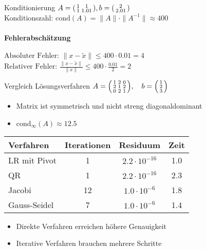 \begin{example2}{Konditionierung}
$A = \begin{psmallmatrix}
1 & 1\\
1 & 1.01
\end{psmallmatrix}, b = \begin{psmallmatrix}
2\\
2.01
\end{psmallmatrix}$\\
Konditionszahl:
$\text{cond}(A) = \|A\| \cdot \|A^{-1}\| \approx 400$
\paragraph{Fehlerabschätzung}
$\text{Absoluter Fehler: }\|x - \tilde{x}\| \leq 400 \cdot 0.01 = 4$ \\
$\text{Relativer Fehler: }\frac{\|x - \tilde{x}\|}{\|x\|} \leq 400 \cdot \frac{0.01}{2} = 2$
\end{example2}

\begin{KR}{Vergleich Lösungsverfahren}
$A = \begin{psmallmatrix}
1 & 2 & 0\\
2 & 1 & 2\\
0 & 2 & 1
\end{psmallmatrix}, \quad b = \begin{psmallmatrix}
1\\
2\\
3
\end{psmallmatrix}$

\small
\begin{itemize}
    \item Matrix ist symmetrisch und nicht streng diagonaldominant
    \item $\text{cond}_\infty(A) \approx 12.5$
\end{itemize}
\begin{center}
\begin{tabular}{l|ccc}
Verfahren & Iterationen & Residuum & Zeit\\
\hline
LR mit Pivot & 1 & $2.2\cdot10^{-16}$ & 1.0\\
QR & 1 & $2.2\cdot10^{-16}$ & 2.3\\
Jacobi & 12 & $1.0\cdot10^{-6}$ & 1.8\\
Gauss-Seidel & 7 & $1.0\cdot10^{-6}$ & 1.4\\
\end{tabular}
\end{center}
\vspace{-2mm}
\begin{itemize}
    \item Direkte Verfahren erreichen höhere Genauigkeit
    \item Iterative Verfahren brauchen mehrere Schritte
\end{itemize}
\end{KR}

